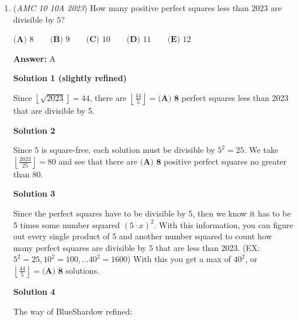 \begin{enumerate}
 So $\frac{P}{3}$ + $\frac{7}{8}$ pound = $\frac{3}{4} P$ + $\frac{1}{8}$ pound; $\frac{P}{3}$ + $\frac{3}{4}$ pound = $\frac{3}{4} P$.

 Multiplying both sides by $\text{lcm}(3,4) = 12$, we have$4P + 9 = 9P$; $5P = 9$; $P$ = weight of a large pizza = $\frac{9}{5}$ pounds = $\boxed{\textbf{(A)}1 \frac{4}{5}}$ pounds. 

 


 


 


	\item (\textit{AMC 10 10A 2023}) How many positive perfect squares less than $2023$ are divisible by $5$? 


 $\textbf{(A) }8\qquad\textbf{(B) }9\qquad\textbf{(C) }10\qquad\textbf{(D) }11\qquad\textbf{(E) }12$

 \textbf{Answer: }A



\textbf{Solution 1 (slightly refined)}

Since $\left \lfloor{\sqrt{2023}}\right \rfloor = 44$, there are $\left \lfloor{\frac{44}{5}}\right \rfloor = \boxed{\textbf{(A) 8}}$ perfect squares less than 2023 that are divisible by 5.

 



\textbf{Solution 2}

Since $5$ is square-free, each solution must be divisible by $5^2=25$. We take $\left \lfloor{\frac{2023}{25}}\right \rfloor = 80$ and see that there are $\boxed{\textbf{(A) 8}}$ positive perfect squares no greater than $80$.

 



\textbf{Solution 3}

Since the perfect squares have to be divisible by 5, then we know it has to be 5 times some number squared $(5 \cdot x)^{2}$. With this information, you can figure out every single product of 5 and another number squared to count how many perfect squares are divisible by 5 that are less than 2023. (EX: $5^{2} = 25, 10^{2} = 100, ... 40^{2} = 1600$) With this you get a max of $40^{2}$, or  $\left \lfloor{\frac{44}{5}}\right \rfloor = \boxed{\textbf{(A) 8}}$ solutions. 

 



\textbf{Solution 4}

The way of BlueShardow refined:


\end{enumerate}
